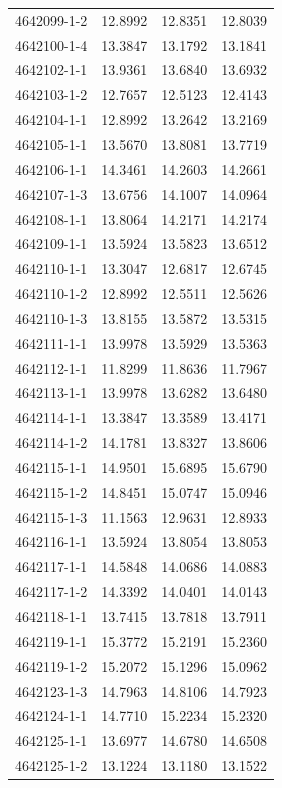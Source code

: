 \begin{longtable}{lrrr}
4642099-1-2 & 12.8992 & 12.8351 & 12.8039 \\
4642100-1-4 & 13.3847 & 13.1792 & 13.1841 \\
4642102-1-1 & 13.9361 & 13.6840 & 13.6932 \\
4642103-1-2 & 12.7657 & 12.5123 & 12.4143 \\
4642104-1-1 & 12.8992 & 13.2642 & 13.2169 \\
4642105-1-1 & 13.5670 & 13.8081 & 13.7719 \\
4642106-1-1 & 14.3461 & 14.2603 & 14.2661 \\
4642107-1-3 & 13.6756 & 14.1007 & 14.0964 \\
4642108-1-1 & 13.8064 & 14.2171 & 14.2174 \\
4642109-1-1 & 13.5924 & 13.5823 & 13.6512 \\
4642110-1-1 & 13.3047 & 12.6817 & 12.6745 \\
4642110-1-2 & 12.8992 & 12.5511 & 12.5626 \\
4642110-1-3 & 13.8155 & 13.5872 & 13.5315 \\
4642111-1-1 & 13.9978 & 13.5929 & 13.5363 \\
4642112-1-1 & 11.8299 & 11.8636 & 11.7967 \\
4642113-1-1 & 13.9978 & 13.6282 & 13.6480 \\
4642114-1-1 & 13.3847 & 13.3589 & 13.4171 \\
4642114-1-2 & 14.1781 & 13.8327 & 13.8606 \\
4642115-1-1 & 14.9501 & 15.6895 & 15.6790 \\
4642115-1-2 & 14.8451 & 15.0747 & 15.0946 \\
4642115-1-3 & 11.1563 & 12.9631 & 12.8933 \\
4642116-1-1 & 13.5924 & 13.8054 & 13.8053 \\
4642117-1-1 & 14.5848 & 14.0686 & 14.0883 \\
4642117-1-2 & 14.3392 & 14.0401 & 14.0143 \\
4642118-1-1 & 13.7415 & 13.7818 & 13.7911 \\
4642119-1-1 & 15.3772 & 15.2191 & 15.2360 \\
4642119-1-2 & 15.2072 & 15.1296 & 15.0962 \\
4642123-1-3 & 14.7963 & 14.8106 & 14.7923 \\
4642124-1-1 & 14.7710 & 15.2234 & 15.2320 \\
4642125-1-1 & 13.6977 & 14.6780 & 14.6508 \\
4642125-1-2 & 13.1224 & 13.1180 & 13.1522 \\

\end{longtable}

